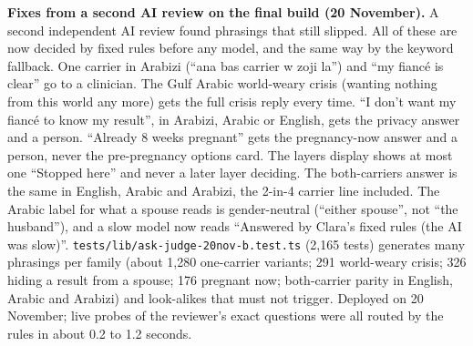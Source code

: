 \documentclass[10.5pt,a4paper]{article}
\newcommand{\file}[1]{\leavevmode\textcolor{muted}{\texttt{\small #1}}}
\begin{document}
\textbf{Fixes from a second AI review on the final build (20 November).} A second independent AI review found phrasings
that still slipped. All of these are now decided by fixed rules before any model, and the same way by the keyword
fallback. One carrier in Arabizi (``ana bas carrier w zoji la'') and ``my fianc\'e is clear'' go to a clinician. The
Gulf Arabic world-weary crisis (wanting nothing from this world any more) gets the full crisis reply every time. ``I
don't want my fianc\'e to know my result'', in Arabizi, Arabic or English, gets the privacy answer and a person.
``Already 8 weeks pregnant'' gets the pregnancy-now answer and a person, never the pre-pregnancy options card. The
layers display shows at most one ``Stopped here'' and never a later layer deciding. The both-carriers answer is the same
in English, Arabic and Arabizi, the 2-in-4 carrier line included. The Arabic label for what a spouse reads is
gender-neutral (``either spouse'', not ``the husband''), and a slow model now reads ``Answered by Clara's fixed rules
(the AI was slow)''. \file{tests/lib/ask-judge-20nov-b.test.ts} (2,165 tests) generates many phrasings per family
(about 1,280 one-carrier variants; 291 world-weary crisis; 326 hiding a result from a spouse; 176 pregnant now;
both-carrier parity in English, Arabic and Arabizi) and look-alikes that must not trigger. Deployed on 20 November; live probes of the reviewer's exact questions were all routed by the rules in about
0.2 to 1.2 seconds.
\end{document}
